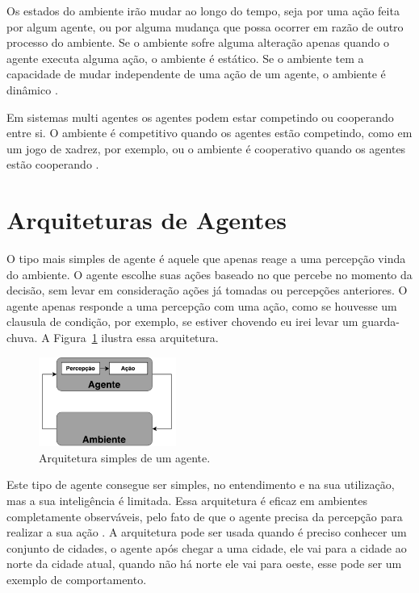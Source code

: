 Os estados do ambiente irão mudar ao longo do tempo, seja por uma ação feita por algum agente, ou por alguma mudança que possa ocorrer em razão de outro processo do ambiente. Se o ambiente sofre alguma alteração apenas quando o agente executa alguma ação, o ambiente é estático. Se o ambiente tem a capacidade de mudar independente de uma ação de um agente, o ambiente é dinâmico \cite{agent1999}.

Em sistemas multi agentes os agentes podem estar competindo ou cooperando entre si. O ambiente é competitivo quando os agentes estão competindo, como em um jogo de xadrez, por exemplo, ou o ambiente é cooperativo quando os agentes estão cooperando \cite{intelligence2003modern}.

\section{Arquiteturas de Agentes}


O tipo mais simples de agente é aquele que apenas reage a uma percepção vinda do ambiente. O agente escolhe suas ações baseado no que percebe no momento da decisão, sem levar em consideração ações já tomadas ou percepções anteriores. O agente apenas responde a uma percepção com uma ação, como se houvesse um clausula de condição, por exemplo, se estiver chovendo eu irei levar um guarda-chuva. A Figura~\ref{fig:agenteSimple} ilustra essa arquitetura. 

\begin{figure}[ht]
	\centering
	\includegraphics[width=0.4\textwidth]{fig/agentSimple.pdf}
	\caption{Arquitetura simples de um agente.}
	\label{fig:agenteSimple}
\end{figure} 


Este tipo de agente consegue ser simples, no entendimento e na sua utilização, mas a sua inteligência é limitada. Essa arquitetura é eficaz em ambientes completamente observáveis, pelo fato de que o agente precisa da percepção para realizar a sua ação \cite{intelligence2003modern}. A arquitetura pode ser usada quando é preciso conhecer um conjunto de cidades, o agente após chegar a uma cidade, ele vai para a cidade ao norte da cidade atual, quando não há norte ele vai para oeste, esse pode ser um exemplo de comportamento. 

